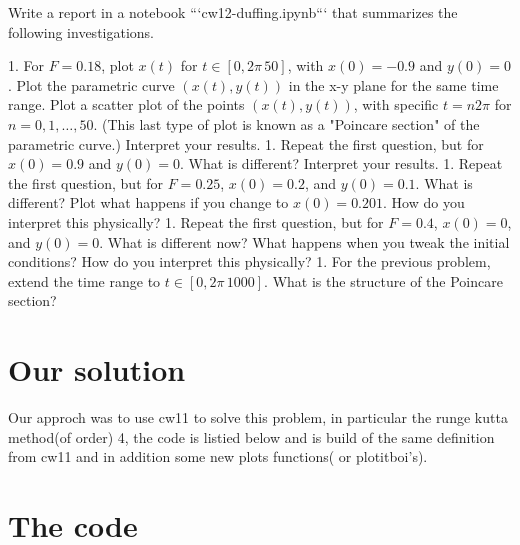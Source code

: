 \documentclass[aps,pra,notitlepage,amsmath,amssymb,letterpaper,12pt]{revtex4-1}
\theoremstyle{definition}
\begin{document}
Write a report in a notebook ```cw12-duffing.ipynb``` that summarizes the following investigations.

1. For $F = 0.18$, plot $x(t)$ for $t\in[0,2\pi\, 50]$, with $x(0) = -0.9$ and $y(0) = 0$. Plot the parametric curve $(x(t),y(t))$ in the x-y plane for the same time range.  Plot a scatter plot of the points $(x(t),y(t))$, with specific $t = n 2\pi$ for $n = 0,1,\ldots,50$. (This last type of plot is known as a "Poincare section" of the parametric curve.)  Interpret your results.
1. Repeat the first question, but for $x(0) = 0.9$ and $y(0) = 0$.  What is different?  Interpret your results.
1. Repeat the first question, but for $F = 0.25$, $x(0) = 0.2$, and $y(0) = 0.1$.  What is different?  Plot what happens if you change to $x(0) = 0.201$. How do you interpret this physically?
1. Repeat the first question, but for $F = 0.4$, $x(0) = 0$, and $y(0) = 0$.  What is different now?  What happens when you tweak the initial conditions?  How do you interpret this physically?
1. For the previous problem, extend the time range to $t\in[0,2\pi\, 1000]$.  What is the structure of the Poincare section?

\section{Our solution} %

Our approch was to use cw11 to solve this problem, in particular the runge kutta method(of order) 4, the code is listied below and is build of the same definition from cw11 and in addition some new plots functions( or plotitboi's).


\section{The code} %
\end{document}
